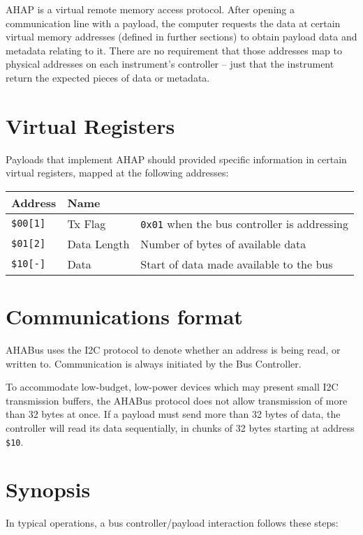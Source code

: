 \begin{appendices}
AHAP is a virtual remote memory access protocol. After opening a
communication line with a payload, the computer requests the data at
certain virtual memory addresses (defined in further sections) to obtain
payload data and metadata relating to it. There are no requirement that
those addresses map to physical addresses on each instrument's
controller -- just that the instrument return the expected pieces of
data or metadata.

\section{Virtual Registers}\label{virtual-registers}

Payloads that implement AHAP should provided specific information in
certain virtual registers, mapped at the following addresses:

\begin{longtable}[]{@{}lll@{}}
Address & Name &\tabularnewline
\midrule
\endhead
\texttt{\$00{[}1{]}} & Tx Flag & \texttt{0x01} when the bus controller
is addressing\tabularnewline
\texttt{\$01{[}2{]}} & Data Length & Number of bytes of available
data\tabularnewline
\texttt{\$10{[}-{]}} & Data & Start of data made available to the
bus\tabularnewline
\end{longtable}

\section{Communications format}\label{communications-format}

AHABus uses the I2C protocol to denote whether an address is being read,
or written to. Communication is always initiated by the Bus Controller.

To accommodate low-budget, low-power devices which may present small I2C
transmission buffers, the AHABus protocol does not allow transmission of
more than 32 bytes at once. If a payload must send more than 32 bytes of
data, the controller will read its data sequentially, in chunks of 32
bytes starting at address \texttt{\$10}.

\section{Synopsis}\label{synopsis}

In typical operations, a bus controller/payload interaction follows
these steps:


\end{appendices}
